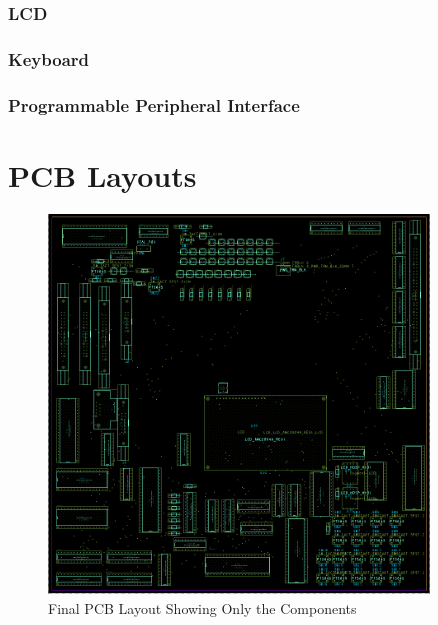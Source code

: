 \begin{appendices}
            \subsubsection{LCD} \label{sec:lcd_asm}

            \newpage
            \subsubsection{Keyboard} \label{sec:keybrd_asm}

            \newpage
            \subsubsection{Programmable Peripheral Interface} \label{sec:ppi_asm}


    \clearpage
    \newpage

    \section{PCB Layouts} \label{appendix:pcb}

        \begin{figure}[ht]
            \begin{center}
                \includegraphics[width=0.9\textwidth]{figures/main.png}
                \caption{Final PCB Layout Showing Only the Components} \label{fig:main}
            \end{center}
        \end{figure}


\end{appendices}
